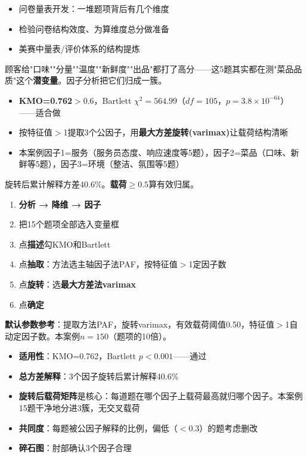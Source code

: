 \begin{algoscene}
\begin{itemize}
    \item 问卷量表开发：一堆题项背后有几个维度
    \item 检验问卷结构效度、为算维度总分做准备
    \item 美赛中量表/评价体系的结构提炼
\end{itemize}
\end{algoscene}

\begin{algoprinciple}
顾客给"口味""分量""温度""新鲜度""出品"都打了高分——这5题其实都在测"菜品品质"这个\textbf{潜变量}。因子分析把它们归成一簇。

\begin{itemize}
    \item \textbf{KMO=0.762}$>0.6$，Bartlett $\chi^2=564.99$（$df=105$，$p=3.8\times10^{-64}$）——适合做
    \item 按特征值$>$1提取3个公因子，用\textbf{最大方差旋转(varimax)}让载荷结构清晰
    \item 本案例因子1=服务（服务员态度、响应速度等5题），因子2=菜品（口味、新鲜等5题），因子3=环境（整洁、氛围等5题）
\end{itemize}

旋转后累计解释方差40.6\%。\textbf{载荷}$\geq0.5$算有效归属。
\end{algoprinciple}

\begin{algosposs}
\begin{enumerate}
    \item \textbf{分析 → 降维 → 因子}
    \item 把15个题项全部选入变量框
    \item 点\textbf{描述}勾KMO和Bartlett
    \item 点\textbf{抽取}：方法选主轴因子法PAF，按特征值$>$1定因子数
    \item 点\textbf{旋转}：选\textbf{最大方差法varimax}
    \item 点\textbf{确定}
\end{enumerate}

\textbf{默认参数参考}：提取方法PAF，旋转varimax，有效载荷阈值0.50，特征值$>$1自动定因子数。本案例$n=150$（题项的10倍）。
\end{algosposs}

\begin{algoresult}
\begin{itemize}
    \item \textbf{适用性}：KMO=0.762，Bartlett $p<0.001$——通过
    \item \textbf{总方差解释}：3个因子旋转后累计解释40.6\%
    \item \textbf{旋转后载荷矩阵}是核心：每道题在哪个因子上载荷最高就归哪个因子。本案例15题干净地分进3簇，无交叉载荷
    \item \textbf{共同度}：每题被公因子解释的比例，偏低（$<0.3$）的题考虑删改
    \item \textbf{碎石图}：肘部确认3个因子合理
\end{itemize}
\end{algoresult}

